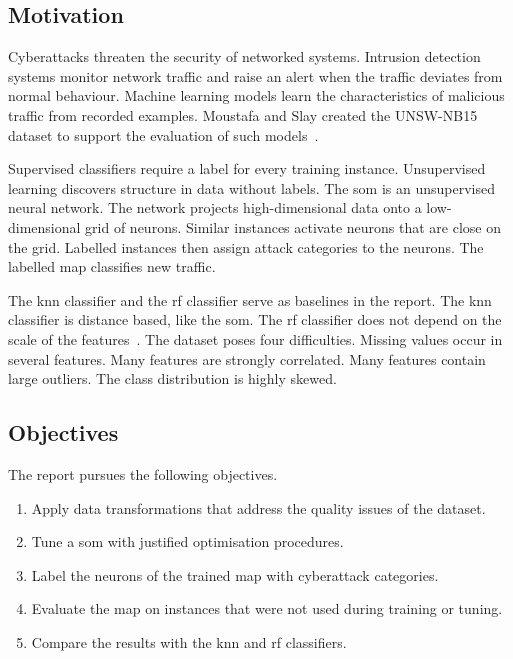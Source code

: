 \documentclass[conference]{IEEEtran}
\begin{document}
\subsection{Motivation}
\label{sub:motivation}

Cyberattacks threaten the security of networked systems.
Intrusion detection systems monitor network traffic and raise an alert when the traffic deviates from normal behaviour.
Machine learning models learn the characteristics of malicious traffic from recorded examples.
Moustafa and Slay created the UNSW-NB15 dataset to support the evaluation of such models~\cite{Moustafa2015}.

Supervised classifiers require a label for every training instance.
Unsupervised learning discovers structure in data without labels.
The \gls{som} is an unsupervised neural network.
The network projects high-dimensional data onto a low-dimensional grid of neurons.
Similar instances activate neurons that are close on the grid.
Labelled instances then assign attack categories to the neurons.
The labelled map classifies new traffic.

The \gls{knn} classifier and the \gls{rf} classifier serve as baselines in the report.
The \gls{knn} classifier is distance based, like the \gls{som}.
The \gls{rf} classifier does not depend on the scale of the features~\cite{Hastie2009}.
The dataset poses four difficulties.
Missing values occur in several features.
Many features are strongly correlated.
Many features contain large outliers.
The class distribution is highly skewed.

\subsection{Objectives}
\label{sub:objectives}

The report pursues the following objectives.

\begin{enumerate}
    \item Apply data transformations that address the quality issues of the dataset.
    \item Tune a \gls{som} with justified optimisation procedures.
    \item Label the neurons of the trained map with cyberattack categories.
    \item Evaluate the map on instances that were not used during training or tuning.
    \item Compare the results with the \gls{knn} and \gls{rf} classifiers.
\end{enumerate}
\end{document}
